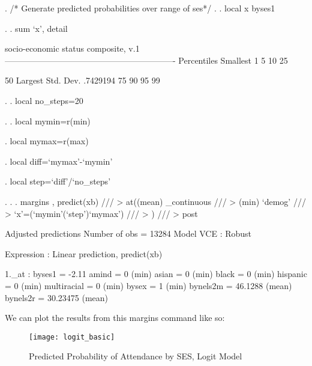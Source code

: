 \documentclass[12pt]{article}
\begin{document}
\begin{stlog}

. /* Generate predicted probabilities over range of ses*/
. 
. local x byses1

. 
. sum `x', detail

            socio-economic status composite, v.1
-------------------------------------------------------------
      Percentiles      Smallest
 1%
 5%
10%
25%

50%
                        Largest       Std. Dev.      .7429194
75%
90%
95%
99%

. 
. local no_steps=20

. 
. local mymin=r(min)

. local mymax=r(max)

. local diff=`mymax'-`mymin'

. local step=`diff'/`no_steps'

. 
.     
. margins , predict(xb) ///
>     at((mean) _continuous ///
>         (min) `demog' ///
>         `x'=(`mymin'(`step')`mymax') ///          
>        ) ///
>       post

Adjusted predictions                              Number of obs   =      13284
Model VCE    : Robust

Expression   : Linear prediction, predict(xb)

1._at        : byses1          =       -2.11
               amind           =           0 (min)
               asian           =           0 (min)
               black           =           0 (min)
               hispanic        =           0 (min)
               multiracial     =           0 (min)
               bysex           =           1 (min)
               bynels2m        =     46.1288 (mean)
               bynels2r        =    30.23475 (mean)
\end{stlog}

We can plot the results from this margins command like so: 



\begin{figure}[h]
  \centering
  \texttt{[image: logit\_basic]}
  \caption{Predicted Probability of Attendance by SES, Logit Model}
\end{figure}
\end{document}
